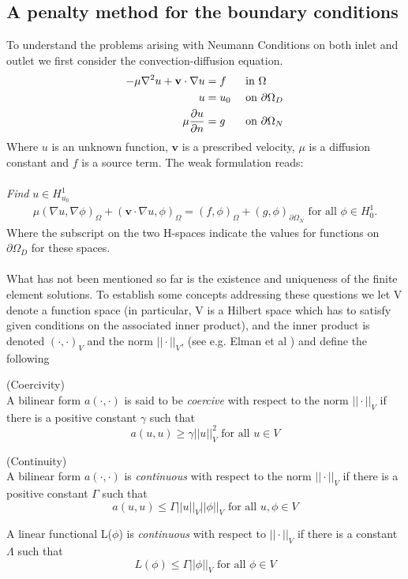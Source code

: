 \subsection{A penalty method for the boundary conditions}
To understand the problems arising with Neumann Conditions on both inlet and outlet we first consider the convection-diffusion equation. 
\begin{alignat}{3}
-\mu \nabla ^2 u + \mathbf{v}\cdot\nabla u & = f && \text{ in } \Omega \\
u & = u_0 && \text{ on } \partial \Omega_D \\
\mu \frac{\partial u}{\partial n} & = g && \text{ on } \partial \Omega_N \label{ConvDiff}
\end{alignat}
Where $u$ is an unknown function, $\mathbf{v}$ is a prescribed velocity, $\mu$ is a diffusion constant and $f$ is a source term. The weak formulation reads:
\\
\\
\textit{Find } $u \in H^1_{u_0}$
\begin{align}
\mu (\nabla u, \nabla \phi)_\Omega+ (\mathbf{v} \cdot \nabla u, \phi)_\Omega = (f,\phi)_\Omega + (g,\phi)_{\partial \Omega_N} \text{ for all } \phi \in H^1_{0}.
\end{align}
Where the subscript on the two H-spaces indicate the values for functions on $\partial \Omega_D$ for these spaces. 
\\
\\
What has not been mentioned so far is the existence and uniqueness of the finite element solutions. To establish some concepts addressing these questions we let V denote a function space (in particular, V is a Hilbert space which has to satisfy given conditions on the associated inner product), and the inner product is denoted $(\cdot,\cdot)_V$ and the norm $||\cdot||_V$, (see e.g. Elman et al \cite{Elma14}) and define the following
\begin{definition}{(Coercivity)} \\
A bilinear form $a(\cdot,\cdot)$ is said to be \textit{coercive} with respect to the norm $||\cdot||_V$ if there is a positive constant $\gamma$ such that 
\[ a(u,u) \geq \gamma ||u||_V^2 \text{ for all } u \in V \]
\end{definition}
\begin{definition}{(Continuity)} \\
A bilinear form $a(\cdot,\cdot)$ is \textit{continuous} with respect to the norm $||\cdot||_V$ if there is a positive constant $\Gamma$ such that 
\[ a(u,u) \leq \Gamma ||u||_V||\phi||_V \text{ for all } u,\phi \in V \]

A linear functional L($\phi$) is \textit{continuous} with respect to $||\cdot||_V$ if there is a constant $\Lambda$ such that
\[ L(\phi) \leq \Gamma ||\phi||_V \text{ for all } \phi \in V \]
\end{definition}
